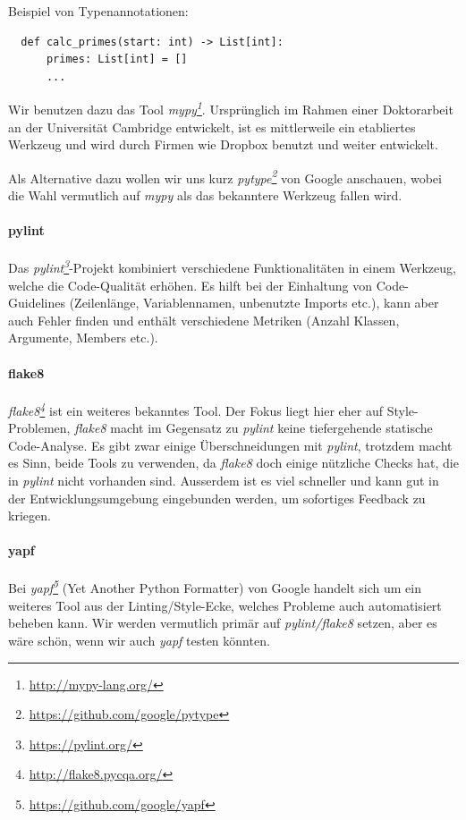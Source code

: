 \documentclass[a4paper]{article}
\newcommand{\tool}[2]{\emph{#1\footnote{\url{#2}}}}
\begin{document}
\pagebreak
Beispiel von Typenannotationen:
\begin{verbatim}
  def calc_primes(start: int) -> List[int]:
      primes: List[int] = []
      ...
\end{verbatim}

Wir benutzen dazu das Tool \tool{mypy}{http://mypy-lang.org/}.
Ursprünglich im Rahmen einer Doktorarbeit an der Universität Cambridge
entwickelt, ist es mittlerweile ein etabliertes Werkzeug und wird durch Firmen wie Dropbox benutzt und weiter entwickelt.

Als Alternative dazu wollen wir uns kurz \tool{pytype}{https://github.com/google/pytype} von Google
anschauen, wobei die Wahl vermutlich auf \emph{mypy} als das bekanntere Werkzeug fallen wird.

\paragraph{pylint} Das \tool{pylint}{https://pylint.org/}-Projekt
kombiniert verschiedene Funktionalitäten in einem Werkzeug, welche die
Code-Qualität erhöhen. Es hilft bei der Einhaltung von Code-Guidelines
(Zeilenlänge, Variablennamen, unbenutzte Imports etc.), kann aber auch Fehler finden und enthält verschiedene Metriken (Anzahl Klassen, Argumente, Members etc.).

\paragraph{flake8} \tool{flake8}{http://flake8.pycqa.org/} ist
ein weiteres bekanntes Tool. Der Fokus liegt hier eher auf Style-Problemen,
\emph{flake8} macht im Gegensatz zu \emph{pylint} keine tiefergehende statische Code-Analyse.
Es gibt zwar einige Überschneidungen mit \emph{pylint}, trotzdem macht es Sinn, beide
Tools zu verwenden, da \emph{flake8} doch einige nützliche Checks hat, die in \emph{pylint}
nicht vorhanden sind. Ausserdem ist es viel schneller und kann gut in der Entwicklungsumgebung eingebunden werden, um sofortiges Feedback zu kriegen.

\paragraph{yapf} Bei \tool{yapf}{https://github.com/google/yapf}
(Yet Another Python Formatter) von Google handelt sich um ein weiteres Tool aus
der Linting/Style-Ecke, welches Probleme auch automatisiert beheben kann. Wir
werden vermutlich primär auf \emph{pylint/flake8} setzen, aber es wäre schön, wenn wir
auch \emph{yapf} testen könnten.
\end{document}
